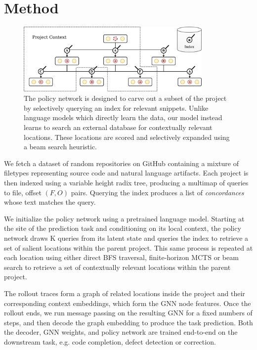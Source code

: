 \documentclass[11pt]{article}
\begin{document}
\section{Method}


\begin{figure}
  \centering
  \includegraphics[width=0.85\textwidth]{architecture}
  \caption{The policy network is designed to carve out a subset of the project by selectively querying an index for relevant snippets. Unlike language models which directly learn the data, our model instead learns to search an external database for contextually relevant locations. These locations are scored and selectively expanded using a beam search heuristic.}
\end{figure}

We fetch a dataset of random repositories on GitHub containing a mixture of filetypes representing source code and natural language artifacts. Each project is then indexed using a variable height radix tree, producing a multimap of queries to file, offset $(F, O)$ pairs. Querying the index produces a list of \textit{concordances} whose text matches the query.

 We initialize the policy network using a pretrained language model. Starting at the site of the prediction task and conditioning on its local context, the policy network draws K queries from its latent state and queries the index to retrieve a set of salient locations within the parent project. This same process is repeated at each location using either direct BFS traversal, finite-horizon MCTS or beam search to retrieve a set of contextually relevant locations within the parent project.

The rollout traces form a graph of related locations inside the project and their corresponding context embeddings, which form the GNN node features. Once the rollout ends, we run message passing on the resulting GNN for a fixed numbers of steps, and then decode the graph embedding to produce the task prediction. Both the decoder, GNN weights, and policy network are trained end-to-end on the downstream task, e.g. code completion, defect detection or correction.
\end{document}

